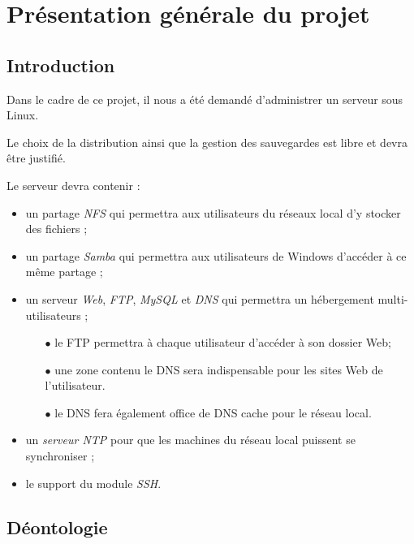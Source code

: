 \section{Présentation générale du projet}
\label{sec:pres-gener-du}

\subsection{Introduction}
\label{subsec:introduction}

Dans le cadre de ce projet, il nous a été demandé d'administrer un serveur sous
Linux.

Le choix de la distribution ainsi que la gestion des sauvegardes est libre et
devra être justifié.

Le serveur devra contenir :
\begin{itemize}
\item un partage \emph{NFS} qui permettra aux utilisateurs du réseaux local
  d'y stocker des fichiers ;

\item un partage \emph{Samba} qui permettra aux utilisateurs de Windows
  d'accéder à ce même partage ;

\item un serveur \emph{Web}, \emph{FTP}, \emph{MySQL} et \emph{DNS} qui
  permettra un hébergement multi-utilisateurs ;
  \begin{itemize}
  \item[\tiny$\bullet$] le FTP permettra à chaque utilisateur d'accéder à son dossier Web;
  \item[\tiny$\bullet$] une zone contenu le DNS sera indispensable pour les
sites Web de l'utilisateur.
  \item[\tiny$\bullet$] le DNS fera également office de DNS cache pour le réseau local.
  \end{itemize}

\item un \emph{serveur NTP} pour que les machines du
  réseau local puissent se synchroniser ;

\item le support du module \emph{SSH}.
\end{itemize}

\newpage

\subsection{Déontologie}
\label{subsec:déontologie}

